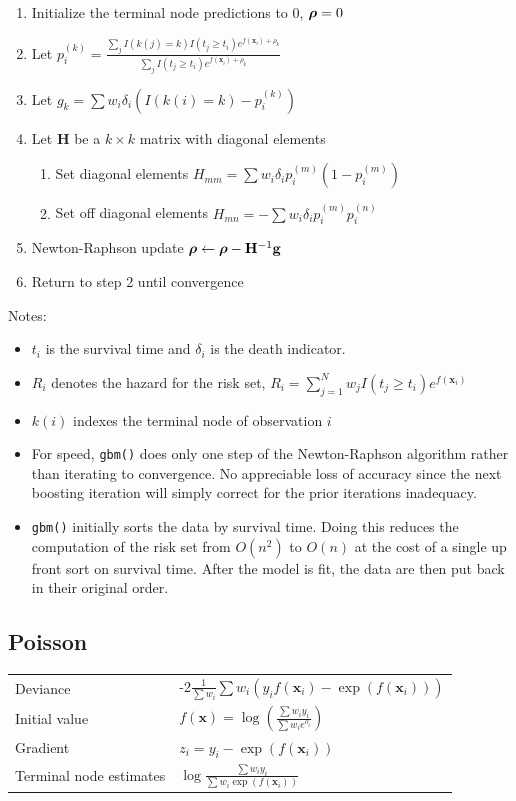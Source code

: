 \documentclass{article}
\newcommand{\mathgbf}[1]{{\mbox{\boldmath$#1$\unboldmath}}}
\begin{document}
\begin{enumerate}
  \item Initialize the terminal node predictions to 0, $\mathgbf{\rho}=0$
  \item Let $\displaystyle
             p_i^{(k)}=\frac{\sum_j I(k(j)=k)I(t_j\geq t_i)e^{f(\mathbf{x}_i)+\rho_k}}
                            {\sum_j I(t_j\geq t_i)e^{f(\mathbf{x}_i)+\rho_k}}$
  \item Let $g_k=\sum w_i\delta_i\left(I(k(i)=k)-p_i^{(k)}\right)$
  \item Let $\mathbf{H}$ be a $k\times k$ matrix with diagonal elements
  \begin{enumerate}
     \item Set diagonal elements $H_{mm}=\sum w_i\delta_i p_i^{(m)}\left(1-p_i^{(m)}\right)$
     \item Set off diagonal elements $H_{mn}=-\sum w_i\delta_i p_i^{(m)}p_i^{(n)}$
  \end{enumerate}
  \item Newton-Raphson update $\mathgbf{\rho} \leftarrow \mathgbf{\rho} - \mathbf{H}^{-1}\mathbf{g}$
  \item Return to step 2 until convergence
\end{enumerate}

Notes: 
\begin{itemize} 
\item $t_i$ is the survival time and $\delta_i$ is the death indicator.
\item $R_i$ denotes the hazard for the risk set, $R_i=\sum_{j=1}^N w_jI(t_j\geq t_i)e^{f(\mathbf{x}_i)}$ 
\item $k(i)$ indexes the terminal node of observation $i$ 
\item For speed, \texttt{gbm()} does only one step of the Newton-Raphson algorithm rather than iterating to convergence. No appreciable loss of accuracy since the next boosting iteration will simply correct for the prior iterations inadequacy.
\item \texttt{gbm()} initially sorts the data by survival time. Doing this reduces the computation of the risk set from $O(n^2)$ to $O(n)$ at the cost of a single up front sort on survival time. After the model is fit, the data are then put back in their original order.  
\end{itemize}

\subsection{Poisson} 
\begin{tabular}{ll} 
Deviance & -2$\frac{1}{\sum w_i} \sum w_i(y_if(\mathbf{x}_i)-\exp(f(\mathbf{x}_i)))$ \\ 
Initial value & $\displaystyle f(\mathbf{x})= \log\left(\frac{\sum w_iy_i}{\sum w_ie^{o_i}}\right)$ \\
Gradient & $z_i=y_i - \exp(f(\mathbf{x}_i))$ \\ 
Terminal node estimates & $\displaystyle \log\frac{\sum w_iy_i}{\sum w_i\exp(f(\mathbf{x}_i))}$ 
\end{tabular}
\end{document}
